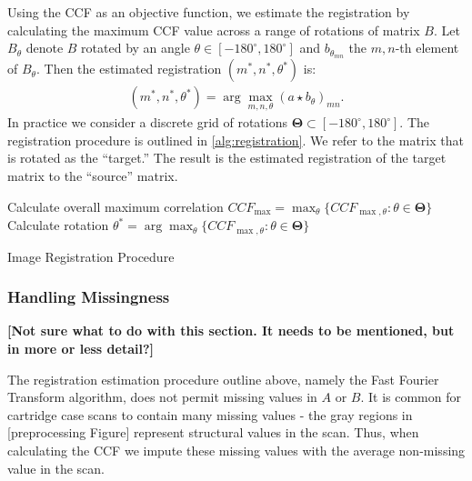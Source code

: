 \documentclass[
]{jdssv}
\begin{document}
Using the CCF as an objective function, we estimate the registration by
calculating the maximum CCF value across a range of rotations of matrix
\(B\). Let \(B_\theta\) denote \(B\) rotated by an angle
\(\theta \in [-180^\circ,180^\circ]\) and \(b_{\theta_{mn}}\) the
\(m,n\)-th element of \(B_\theta\). Then the estimated registration
\((m^*,n^*,\theta^*)\) is: \begin{align*}
(m^*,n^*,\theta^*) = \arg \max_{m,n,\theta} (a \star b_\theta)_{mn}.
\end{align*} In practice we consider a discrete grid of rotations
\(\pmb{\Theta} \subset [-180^\circ,180^\circ]\). The registration
procedure is outlined in \autoref{alg:registration}. We refer to the
matrix that is rotated as the ``target.'' The result is the estimated
registration of the target matrix to the ``source'' matrix.

\begin{algorithm}[htbp]
Calculate overall maximum correlation $CCF_{\max} = \max_{\theta} \{CCF_{\max,\theta} : \theta \in \pmb{\Theta}\}$\;
Calculate rotation $\theta^* = \arg \max_{\theta} \{CCF_{\max,\theta} : \theta \in \pmb{\Theta}\}$\;
\caption{Image Registration Procedure}
\label{alg:registration}
\end{algorithm}

\hypertarget{handling-missingness}{%
\subsubsection{Handling Missingness}\label{handling-missingness}}

\textbf{[Not sure what to do with this section.
It needs to be mentioned, but in more or less detail?]}

The registration estimation procedure outline above, namely the Fast
Fourier Transform algorithm, does not permit missing values in \(A\) or
\(B\). It is common for cartridge case scans to contain many missing
values - the gray regions in {[}preprocessing Figure{]} represent
structural values in the scan. Thus, when calculating the CCF we impute
these missing values with the average non-missing value in the scan.
\end{document}
